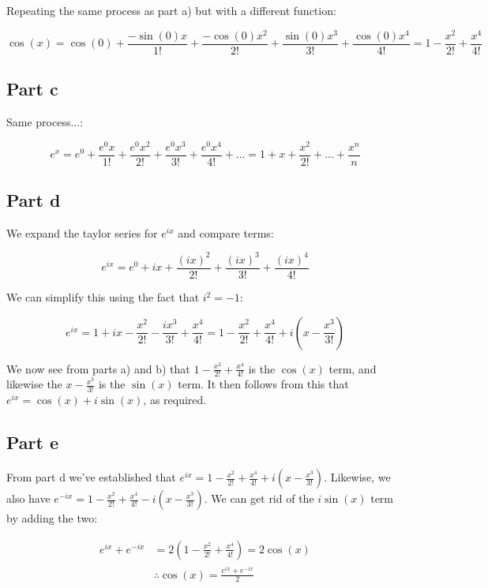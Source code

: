 \documentclass{article}
\theoremstyle{definition}
\numberwithin{equation}{section}
\numberwithin{definition}{section}
\begin{document}
Repeating the same process as part a) but with a different function:

\[ \cos(x) = \cos(0) + \frac{-\sin(0) x}{1!} + \frac{-\cos(0)x^2}{2!} + \frac{\sin(0)x^3}{3!} + \frac{\cos(0)x^4}{4!} = 1-\frac{x^2}{2!} + \frac{x^4}{4!}\]

\subsection{Part c}

Same process...:

\[ e^x = e^0 + \frac{e^0 x}{1!} + \frac{e^0x^2}{2!} + \frac{e^0x^3}{3!} + \frac{e^0 x^4}{4!} + \dots = 1 + x + \frac{x^2}{2!} + \dots + \frac{x^n}{n}\]

\subsection{Part d}

We expand the taylor series for $e^{ix}$ and compare terms:

\[e^{ix} = e^0 + ix + \frac{(ix)^2}{2!} + \frac{(ix)^3}{3!} + \frac{(ix)^4}{4!}\]

We can simplify this using the fact that $i^2 = -1$:

\[e^{ix} = 1 + ix - \frac{x^2}{2!} - \frac{ix^3}{3!} + \frac{x^4}{4!} = 1-\frac{x^2}{2!} + \frac{x^4}{4!} + i\left(x - \frac{x^3}{3!}\right)\]

We now see from parts a) and b) that $1 - \frac{x^2}{2!} + \frac{x^4}{4!}$ is the $\cos(x)$ term, and likewise the $x - \frac{x^3}{3!}$ is the $\sin(x)$ term. It then follows from this that $e^{ix} = \cos(x) + i\sin(x)$, as required.

\subsection{Part e}

From part d we've established that $e^{ix} = 1-\frac{x^2}{2!} + \frac{x^4}{4!} + i\left(x - \frac{x^3}{3!}\right)$. Likewise, we also have $e^{-ix} = 1-\frac{x^2}{2!} + \frac{x^4}{4!} - i\left(x - \frac{x^3}{3!}\right)$. We can get rid of the $i\sin(x)$ term by adding the two:

\begin{align*}
	e^{ix} + e^{-ix} &= 2\left(1 - \frac{x^2}{2!} + \frac{x^4}{4!}\right) = 2\cos(x)\\
	&\therefore \cos(x) = \frac{e^{ix} + e^{-ix}}{2}
\end{align*}
\end{document}
